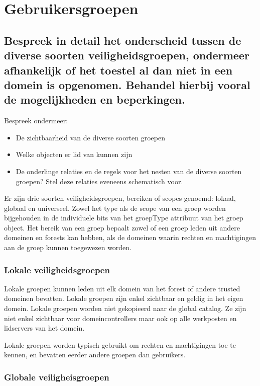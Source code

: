 \chapter{Gebruikersgroepen}

\section{Bespreek in detail het onderscheid tussen de diverse soorten
veiligheidsgroepen, ondermeer afhankelijk of het toestel al dan niet in een
domein is opgenomen. Behandel hierbij vooral de mogelijkheden en beperkingen.}

Bespreek ondermeer:
\begin{itemize}
	\item De zichtbaarheid van de diverse soorten groepen
	\item Welke objecten er lid van kunnen zijn
	\item De onderlinge relaties en de regels voor het nesten van de diverse
		soorten groepen? Stel deze relaties eveneens schematisch voor.
\end{itemize}

Er zijn drie soorten veiligheidsgroepen, bereiken of scopes genoemd: lokaal,
globaal en universeel. Zowel het type als de scope van een groep worden
bijgehouden in de individuele bits van het groepType attribuut van het groep
object. Het bereik van een groep bepaalt zowel of een groep leden uit andere
domeinen en forests kan hebben, als de domeinen waarin rechten en machtigingen
aan de groep kunnen toegewezen worden.

\subsection{Lokale veiligheidsgroepen}

Lokale groepen kunnen leden uit elk domein van het forest of andere trusted
domeinen bevatten. Lokale groepen zijn enkel zichtbaar en geldig in het eigen
domein. Lokale groepen worden niet gekopieerd naar de global catalog. Ze zijn
niet enkel zichtbaar voor domeincontrollers maar ook op alle werkposten en
lidservers van het domein.

Lokale groepen worden typisch gebruikt om rechten en machtigingen toe te kennen,
en bevatten eerder andere groepen dan gebruikers.

\subsection{Globale veiligheisgroepen}

